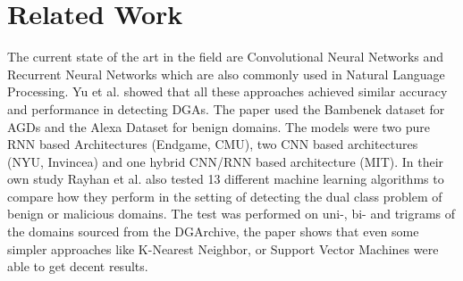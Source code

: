 \documentclass[a4paper, 12pt]{article}
\begin{document}
\section{Related Work}
The current state of the art in the field are Convolutional Neural Networks and Recurrent Neural
Networks which are also commonly used in Natural Language Processing. Yu et al.
\cite{yu_character_2018} showed that all these approaches achieved similar accuracy and performance
in detecting DGAs.  The paper used the Bambenek dataset for AGDs and the Alexa Dataset for benign
domains. The models were two pure RNN based Architectures (Endgame, CMU), two CNN based
architectures (NYU, Invincea) and one hybrid CNN/RNN based architecture (MIT). 
In their own study Rayhan et al. \cite{rayhan_experimental_2020} also tested 13 different
machine learning algorithms to compare how they perform in the setting of detecting the dual class
problem of benign or malicious domains. The test was performed on uni-, bi- and trigrams of the
domains sourced from the DGArchive, the paper shows that even some simpler approaches like K-Nearest
Neighbor, or Support Vector Machines were able to get decent results.

\clearpage

\printbibliography
\end{document}
